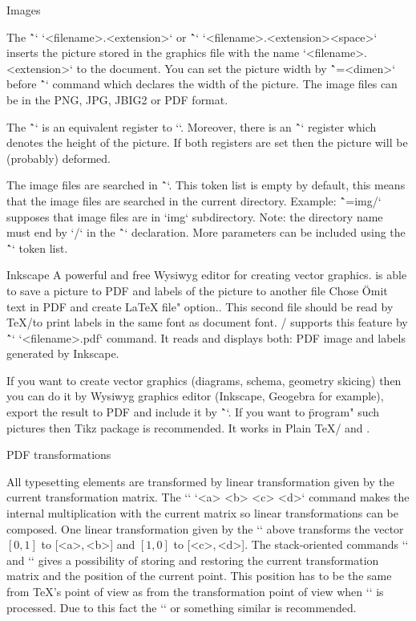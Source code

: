 {\secc Images

The \^`\inspic` `{<filename>.<extension>}` or
\^`\inspic` `<filename>.<extension><space>`
inserts the picture stored in
the graphics file with the name `<filename>.<extension>` to the document.
You can set the picture width by \^`\picw=<dimen>`
before \^`\inspic` command which declares the width of the picture.
The image files can be in the PNG, JPG, JBIG2 or PDF format.

The \^`\picwidth` is an equivalent register to `\picw`. Moreover, there is an
\^`\picheight` register which denotes the height of the picture. If both
registers are set then the picture will be (probably) deformed.

The image files are searched in \^`\picdir`. This token list is empty
by default, this means that the image files are searched in the
current directory. Example: \^`\picdir={img/}` supposes that image files are
in `img` subdirectory. Note: the directory name must end by `/` in
the \^`\picdir` declaration.
More parameters can be included using the \^`\picparams` token list.

Inkscape\fnote
{A powerful and free Wysiwyg editor for creating vector graphics.}
is able to save a picture to PDF and labels of the picture to another
file\fnote
{Chose \"Omit text in PDF and create LaTeX file" option.}.
This second file should be read by \TeX/to print labels
in the same font as document font. \OpTeX/ supports this feature by
\^`\inkinspic` `{<filename>.pdf}` command. It reads and displays
both: PDF image and labels generated by Inkscape.

If you want to create vector graphics (diagrams, schema, geometry
skicing) then you can do it by Wysiwyg graphics editor (Inkscape, Geogebra for
example), export the result to PDF and include it by \^`\inspic`.
If you want to \"program" such pictures then Tikz package is recommended.
It works in Plain \TeX/ and \OpTeX.

\secc PDF transformations

All typesetting elements are transformed by linear
transformation given by the current transformation matrix. The
`\pdfsetmatrix` `{<a> <b> <c> <d>}` command makes the internal multiplication
with the current matrix so linear transformations can be composed.
One linear transformation given by the `\pdfsetmatrix` above transforms
the vector $[0,1]$ to [<a>,\,<b>] and $[1,0]$ to [<c>,\,<d>].
The stack-oriented commands `\pdfsave` and `\pdfrestore` gives a possibility of
storing and restoring the current transformation matrix and the position of the current point.
This position has to be the same from \TeX{}'s point of
view as from the transformation point of view when `\pdfrestore` is processed.
Due to this fact the `\pdfsave{}\pdfrestore`
or something similar is recommended.

}
